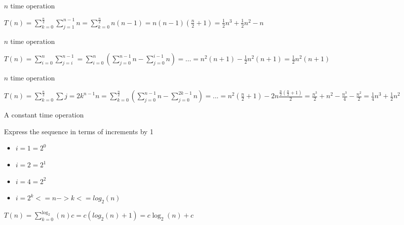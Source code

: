 \begin{multicols}{2}
  \noindent \hrulefill
  \begin{algorithmic}[1]
    \State $n$ time operation
    \EndFor
    \EndFor
  \end{algorithmic}
  \noindent \hrulefill

  $T(n) = \sum_{k=0}^{\frac{n}{2}} \sum_{j=1}^{n-1} n = \sum_{k=0}^{\frac{n}{2}} n(n - 1) = n(n - 1)(\frac{n}{2} + 1) = \frac{1}{2} n^3 + \frac{1}{2} n^2 - n$

  \columnbreak

  \noindent \hrulefill
  \begin{algorithmic}[1]
    \State $n$ time operation
    \EndFor
    \EndFor
  \end{algorithmic}
  \noindent \hrulefill

  $T(n) = \sum_{i=0}^{n} \sum_{j=i}^{n-1} = \sum_{i=0}^{n} (\sum_{j=0}^{n-1} n - \sum_{j=0}^{i-1} n) = ... = n^2 (n + 1) - \frac{1}{2} n^2 (n+1) = \frac{1}{2} n^2 (n+1)$
\end{multicols}

\begin{multicols}{2}
  \noindent \hrulefill
  \begin{algorithmic}[1]
    \State $n$ time operation
    \EndFor
    \EndFor
  \end{algorithmic}
  \noindent \hrulefill

  $T(n) = \sum_{k=0}^{\frac{n}{2}} \sum{j=2k}^{n-1} n = \sum_{k=0}^{\frac{n}{2}} (\sum_{j=0}^{n-1} n - \sum_{j=0}^{2k-1} n) = ... = n^2(\frac{n}{2} + 1) - 2n \frac{\frac{n}{2} (\frac{n}{2} + 1)}{2} = \frac{n^3}{2} + n^2 - \frac{n^3}{4} - \frac{n^2}{2} = \frac{1}{4} n^3 + \frac{1}{2} n^2$

  \columnbreak

  \noindent \hrulefill
  \begin{algorithmic}[1]
    \State A constant time operation
    \EndFor
  \end{algorithmic}
  \noindent \hrulefill

  Express the sequence in terms of increments by 1
  \begin{itemize}
    \item $i = 1 = 2^0$
    \item $i = 2 = 2^1$
    \item $i = 4 = 2^2$
    \item $i = 2^k <= n -> k <= log_{2} (n)$
  \end{itemize}

  $T(n) = \sum_{k=0}^{\log_{2}} (n) c = c(log_{2} (n) + 1) = c \log_{2} (n) + c$
\end{multicols}

